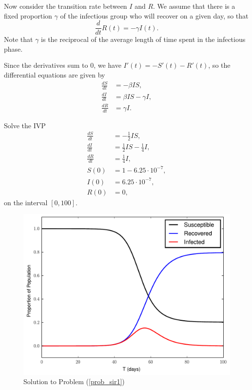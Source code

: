  Now consider the transition rate between $I$ and $R$.
We assume that there is a fixed proportion $\gamma$ of the infectious group who will recover on a given day, so that
\[\frac{d}{dt}R(t) = -\gamma I(t).\]
Note that $\gamma$ is the reciprocal of the average length of time spent in the infectious phase.

Since the derivatives sum to $0$, we have $I'(t) = - S'(t) - R'(t)$, so the  differential equations are given by
\begin{align*}
\frac{dS}{dt} &=-\beta IS ,\\
\frac{dI}{dt} &= \beta I S-\gamma I,\\
\frac{dR}{dt} &=\gamma I.
\end{align*}

\begin{problem}
Solve the IVP
\begin{align*}
\frac{dS}{dt} &=-\frac{1}{2} IS ,\\
\frac{dI}{dt} &= \frac{1}{2} I S-\frac{1}{4} I, \\
\frac{dR}{dt} &=\frac{1}{4} I,\\
S(0) &= 1-6.25\cdot10^{-7},\\
I(0) &= 6.25\cdot10^{-7},\\
R(0) &=0,
\end{align*}
on the interval $[0,100]$. \label{prob_sir1}
\end{problem}

\begin{figure}[ht]
\centering
\includegraphics[width=\textwidth]{SIR1.pdf}
\caption{Solution to Problem (\ref{prob_sir1})}
\label{sir1}
\end{figure}

